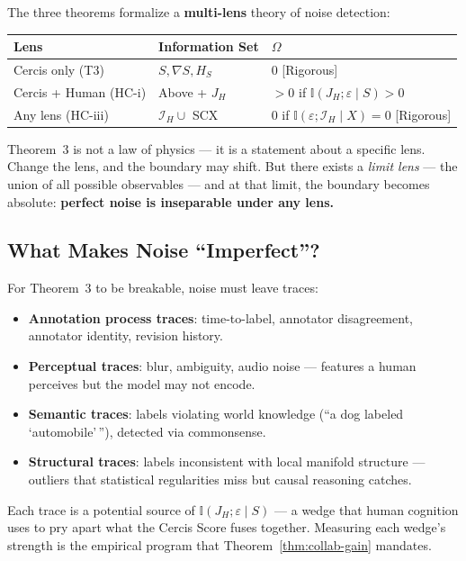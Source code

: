 \documentclass[12pt,a4paper]{article}
\newcommand{\rigorous}{\textcolor{green!50!black}{\small\textsf{[Rigorous]}}}
\newcommand{\I}{\mathbb{I}}
\newcommand{\cI}{\mathcal{I}}
\begin{document}
The three theorems formalize a \textbf{multi-lens} theory of noise detection:

\begin{center}
\begin{tabular}{@{}lll@{}}
\toprule
\textbf{Lens} & \textbf{Information Set} & \textbf{$\Omega$} \\
\midrule
Cercis only (T3)        & $S, \nabla S, H_S$           & $0$ \rigorous \\
Cercis + Human (HC-i)   & Above + $J_H$                & $>0$ if $\I(J_H; \varepsilon \mid S) > 0$ \\
Any lens (HC-iii)       & $\cI_H \cup$ SCX             & $0$ if $\I(\varepsilon; \cI_H \mid X) = 0$ \rigorous \\
\bottomrule
\end{tabular}
\end{center}

Theorem~3 is not a law of physics — it is a statement about a specific lens.
Change the lens, and the boundary may shift.  But there exists a \emph{limit
lens} — the union of all possible observables — and at that limit, the
boundary becomes absolute: \textbf{perfect noise is inseparable under any
lens.}

\subsection{What Makes Noise ``Imperfect''?}

For Theorem~3 to be breakable, noise must leave traces:
\begin{itemize}
    \item \textbf{Annotation process traces}: time-to-label, annotator
          disagreement, annotator identity, revision history.
    \item \textbf{Perceptual traces}: blur, ambiguity, audio noise — features
          a human perceives but the model may not encode.
    \item \textbf{Semantic traces}: labels violating world knowledge
          (``a dog labeled `automobile'\,''), detected via commonsense.
    \item \textbf{Structural traces}: labels inconsistent with local manifold
          structure — outliers that statistical regularities miss but
          causal reasoning catches.
\end{itemize}
Each trace is a potential source of $\I(J_H; \varepsilon \mid S)$ — a wedge
that human cognition uses to pry apart what the Cercis Score fuses together.
Measuring each wedge's strength is the empirical program that
Theorem~\ref{thm:collab-gain} mandates.
\end{document}
